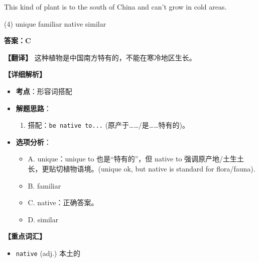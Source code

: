 \documentclass[11pt, a4paper]{article}
\newcommand{\analysis}[4]{
    \begin{solutionbox}
        \textbf{答案：#1}
        
        \textbf{【翻译】} #2
        
        \textbf{【详细解析】}
        #3
        
        \textbf{【重点词汇】}
        #4
    \end{solutionbox}
}
\newcommand{\blank}{\underline{\hspace{1.5cm}}}
\begin{document}
\begin{questions}
    \item This kind of plant is \blank to the south of China and can’t grow in cold areas.
    \begin{tasks}(4)
        \task unique \task familiar \task native \task similar
    \end{tasks}
    \analysis{C}{这种植物是中国南方特有的，不能在寒冷地区生长。}{
        \begin{itemize}
            \item \textbf{考点}：形容词搭配
            \item \textbf{解题思路}：
                \begin{enumerate}
                    \item 搭配：\texttt{be native to...} (原产于……/是……特有的)。
                \end{enumerate}
            \item \textbf{选项分析}：
                \begin{itemize}
                    \item A. unique：unique to 也是“特有的”，但 native to 强调原产地/土生土长，更贴切植物语境。(unique ok, but native is standard for flora/fauna).
                    \item B. familiar
                    \item C. native：正确答案。
                    \item D. similar
                \end{itemize}
        \end{itemize}
    }{
        \begin{itemize}
            \item \texttt{native} (adj.) 本土的
        \end{itemize}
    }


\end{questions}
\end{document}
